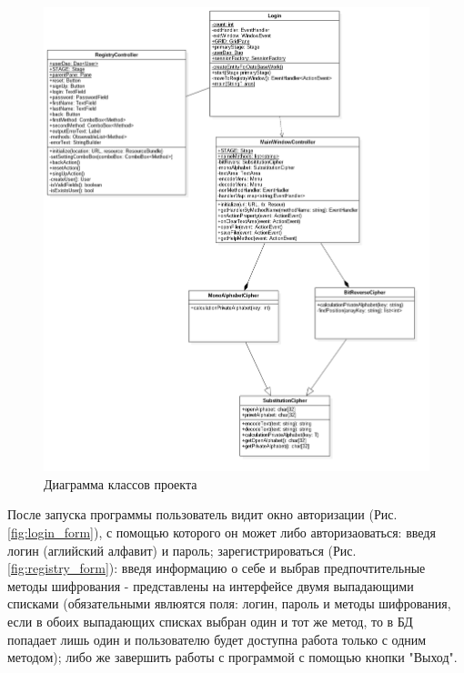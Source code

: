 \documentclass[a4paper,12pt]{article}
\begin{document}
\begin{center}
	\begin{figure}[h!]
		\centering
   		\includegraphics[scale=0.5]{img/class_diagram.png}
   		\caption{Диаграмма классов проекта}
   		\label{fig:class_diagram}
    \end{figure}
\end{center}
После запуска программы пользователь видит окно авторизации (Рис. \ref{fig:login_form}), с помощью которого он может либо авторизаоваться: введя логин (аглийский алфавит) и пароль; зарегистрироваться (Рис. \ref{fig:registry_form}): введя информацию о себе и выбрав предпочтительные методы шифрования - представлены на интерфейсе двумя выпадающими списками (обязательными явлюятся поля: логин, пароль и методы шифрования, если в обоих выпадающих списках выбран один и тот же метод, то в БД попадает лишь один и пользователю будет доступна работа только с одним методом); либо же завершить работы с программой с помощью кнопки "Выход".
\end{document}
